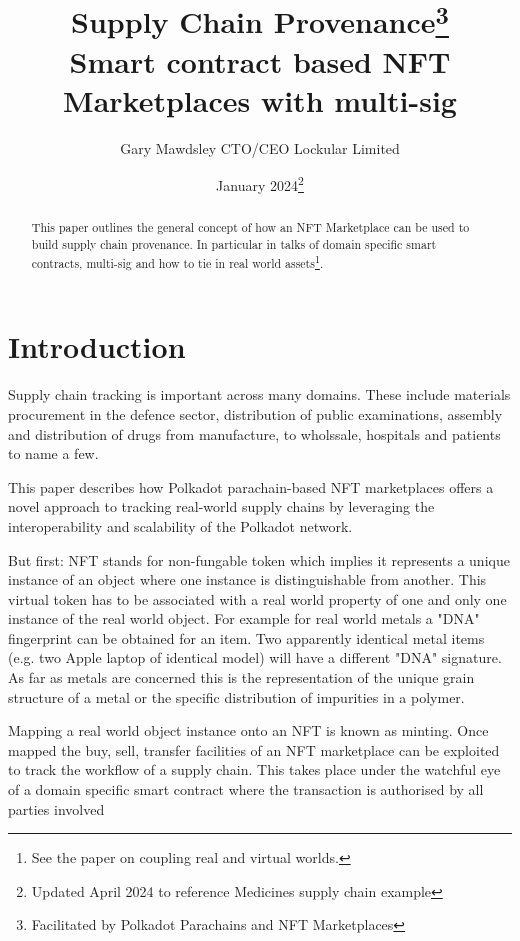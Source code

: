 \documentclass{tufte-handout}
\title{Supply Chain Provenance\thanks{Facilitated by Polkadot Parachains and NFT Marketplaces} \\
\large Smart contract based NFT Marketplaces with multi-sig}
\author[Gary Mawdsley]{Gary Mawdsley CTO/CEO Lockular Limited}
\date{January 2024\thanks{Updated April 2024 to reference Medicines supply chain example}}  %
\begin{document}
\maketitle%

\begin{abstract}
\noindent This paper outlines the general concept of how an NFT Marketplace can be used to build supply chain provenance.
In particular in talks of domain specific smart contracts, multi-sig and how to tie in real world assets\thanks{See the paper on coupling real and virtual worlds.}.

\end{abstract}

\section{Introduction}\label{sec:page-layout}
Supply chain tracking is important across many domains. These include materials procurement in the defence sector,
distribution of public examinations, assembly and distribution of drugs from manufacture, to wholssale, hospitals
and patients to name a few.

This paper describes how Polkadot parachain-based NFT marketplaces offers a novel approach to tracking real-world supply
chains by leveraging the interoperability and scalability of the Polkadot network.

But first: NFT stands for non-fungable token which implies it represents a unique instance of an object where one instance is
distinguishable from another. This virtual token has to be associated with a real world property of one and only one instance
of the real world object. For example for real world metals a "DNA" fingerprint can be obtained for an item. Two apparently
identical metal items (e.g. two Apple laptop of identical model) will have a different "DNA" signature. As far as metals are
concerned this is the representation of the unique grain structure of a metal or the specific distribution of impurities in a polymer.

Mapping a real world object instance onto an NFT is known as minting. Once mapped the buy, sell, transfer facilities of an NFT marketplace
can be exploited to track the workflow of a supply chain. This takes place under the watchful eye of a domain specific smart contract where
the transaction is authorised by all parties involved
\end{document}
